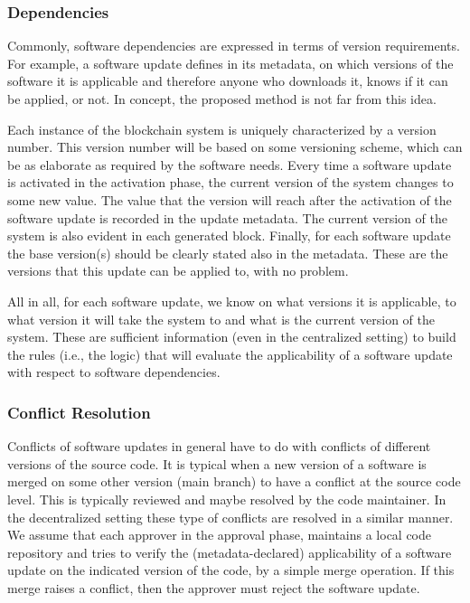 \subsubsection{Dependencies}
Commonly, software dependencies are expressed in terms of version requirements. For example, a software update defines in its metadata, on which versions of the software it is applicable and therefore anyone who downloads it, knows if it can be applied, or not. In concept, the proposed method is not far from this idea.

Each instance of the blockchain system is uniquely characterized by a version number. This version number will be based on some versioning scheme, which can be as elaborate as required by the software needs. Every time a software update is activated in the activation phase, the current version of the system changes to some new value. The value that the version will reach after the activation of the software update is recorded in the update metadata. The current version of the system is also evident in each generated block. 
 Finally, for each software update the base version(s) should be clearly stated also in the metadata. These are the versions that this update can be applied to, with no problem. 

All in all, for each software update, we know on what versions it is applicable, to what version it will take the system to and what is the current version of the system. These are sufficient information (even in the centralized setting) to build the rules (i.e., the logic) that will evaluate the applicability of a software update with respect to software dependencies.

%
%

\subsubsection{Conflict Resolution}
Conflicts of software updates in general have to do with conflicts of different versions of the source code. It is typical when a new version of a software is merged on some other version (main branch) to have a conflict at the source code level. This is typically reviewed and maybe resolved by the code maintainer. In the decentralized setting these type of conflicts are resolved in a similar manner. We assume that each approver in the approval phase, maintains a local code repository and tries to verify the (metadata-declared) applicability of a software update on the indicated version of the code, by a simple merge operation. If this merge raises a conflict, then the approver must reject the software update.

